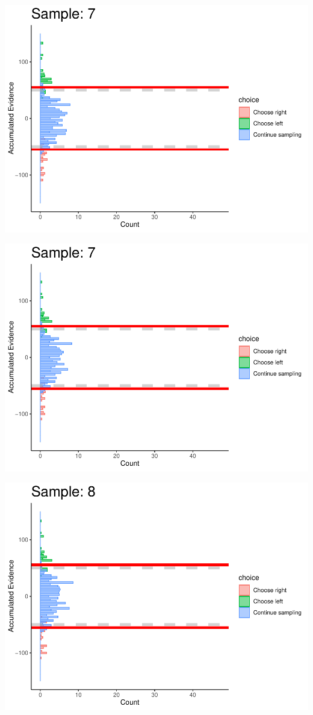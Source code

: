 \documentclass[
]{book}
\begin{document}
\begin{center}\includegraphics[width=0.8\linewidth]{LateNightBayes_files/figure-latex/fixed_dcb-67} \end{center}

\begin{center}\includegraphics[width=0.8\linewidth]{LateNightBayes_files/figure-latex/fixed_dcb-68} \end{center}

\begin{center}\includegraphics[width=0.8\linewidth]{LateNightBayes_files/figure-latex/fixed_dcb-69} \end{center}
\end{document}
